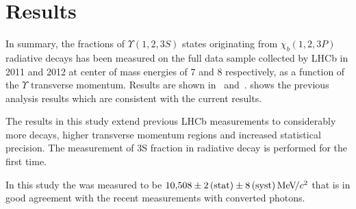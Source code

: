 \section{Results}
\label{sec:results}

In summary, the fractions of $\Upsilon(1,2,3S)$ states originating from $\chi_b(1,2,3P)$ 
radiative decays has been measured on the full data sample collected by LHCb in 2011 and 2012 
at center of mass energies of 7 and 8 \tev respectively, as a function of the $\Upsilon$ 
transverse momentum. Results are shown in~
and~.
 shows the previous analysis results which
are consistent with the current results.






The results in this study extend previous LHCb measurements to considerably
more decays, higher transverse momentum regions and increased statistical
precision. The measurement of
\Y3S fraction in radiative \chibThreeP decay is performed for the first time.

In this study the \chiboneThreeP was measured to be $10{,}508 \pm 2\mathrm{\,(stat)} \pm 8\mathrm{\,(syst)} {\mathrm{\,Me\kern -0.1em V\!/}c^2}$ that
is in good agreement with the recent \lhcb measurements with converted photons.


